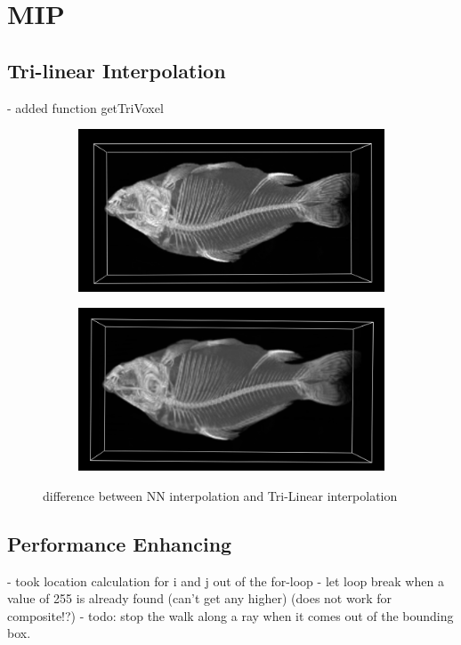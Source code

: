 \section{MIP}\label{sec:mip}

\subsection{Tri-linear Interpolation}\label{sec:tri_linear}
- added function getTriVoxel

\begin{figure}[h!]
    \centering
    \captionsetup{justification=centering,margin=0.5cm}
    \begin{subfigure}[t]{0.48\textwidth}
        \includegraphics[width=\textwidth]{img/fish_NN.png}
        \caption{ }
    \end{subfigure}
    \begin{subfigure}[t]{0.48\textwidth}
        \includegraphics[width=\textwidth]{img/fish_TriLin.png}
        \caption{ }
    \end{subfigure}
    \caption{difference between NN interpolation and Tri-Linear interpolation}
    \label{fig:trilinear}
\end{figure}

\subsection{Performance Enhancing}\label{sec:perf_enh}

- took location calculation for i and j out of the for-loop
- let loop break when a value of 255 is already found (can't get any higher) (does not work for composite!?)
- todo: stop the walk along a ray when it comes out of the bounding box. 